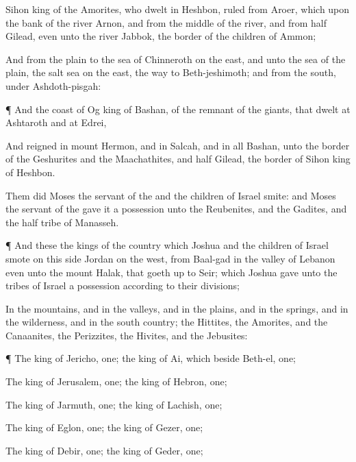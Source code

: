 {Sihon
king of the
Amorites, who
dwelt in
Heshbon,
{}
ruled from
Aroer, which
{} upon the
bank of the
river
Arnon, and from the
middle of the
river, and from
half
Gilead, even unto the
river
Jabbok,
{} the
border of the
children of
Ammon;

And from the
plain to the
sea of
Chinneroth on the
east, and unto the
sea of the
plain,
{} the
salt
sea on the
east, the
way to
Beth-jeshimoth; and from the
south, under
Ashdoth-pisgah:


\par }{\PP {}¶ And the
coast of
Og
king of
Bashan,
{} of the
remnant of the
giants, that
dwelt at
Ashtaroth and at
Edrei,

And
reigned in
mount
Hermon, and in
Salcah, and in all
Bashan, unto the
border of the
Geshurites and the
Maachathites, and
half
Gilead, the
border of
Sihon
king of
Heshbon.

Them did
Moses the
servant of the
{} and the
children of
Israel
smite: and
Moses the
servant of the
{}
gave it
{} a
possession unto the
Reubenites, and the
Gadites, and the
half
tribe of
Manasseh.


\par }{\PP {}¶ And these
{} the
kings of the
country which
Joshua and the
children of
Israel
smote on this
side
Jordan on the
west, from
Baal-gad in the
valley of
Lebanon even unto the
mount
Halak, that goeth
up to
Seir; which
Joshua
gave unto the
tribes of
Israel
{} a
possession according to their
divisions;

In the
mountains, and in the
valleys, and in the
plains, and in the
springs, and in the
wilderness, and in the south
country; the
Hittites, the
Amorites, and the
Canaanites, the
Perizzites, the
Hivites, and the
Jebusites:


\par }{\PP {}¶ The
king of
Jericho,
one; the
king of
Ai, which
{}
beside
Beth-el,
one;

The
king of
Jerusalem,
one; the
king of
Hebron,
one;

The
king of
Jarmuth,
one; the
king of
Lachish,
one;

The
king of
Eglon,
one; the
king of
Gezer,
one;

The
king of
Debir,
one; the
king of
Geder,
one;

}
